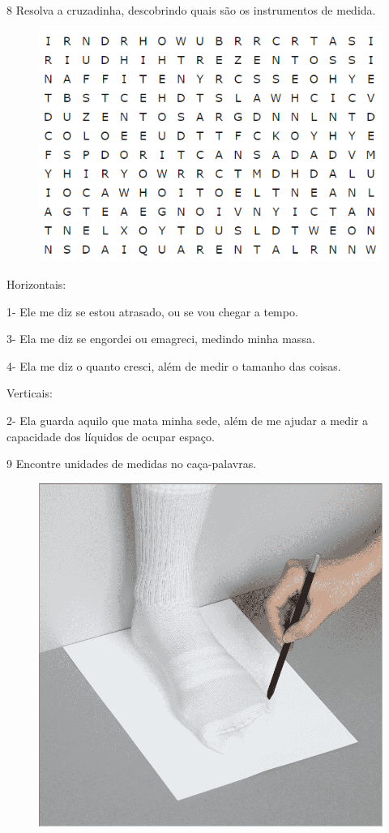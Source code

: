 \num{8} Resolva a cruzadinha, descobrindo quais são os instrumentos de medida.

\begin{figure}[htpb!]
\includegraphics[width=\textwidth]{./media/image38.png}
\end{figure}

Horizontais:

1- Ele me diz se estou atrasado, ou se vou chegar a tempo.

3- Ela me diz se engordei ou emagreci, medindo minha massa.

4- Ela me diz o quanto cresci, além de medir o tamanho das coisas.

Verticais:

2- Ela guarda aquilo que mata minha sede, além de me ajudar a medir a
capacidade dos líquidos de ocupar espaço.

\num{9} Encontre unidades de medidas no caça-palavras.

\begin{figure}[htpb!]
\includegraphics[width=.8\textwidth]{./media/image40.png}
\end{figure}

